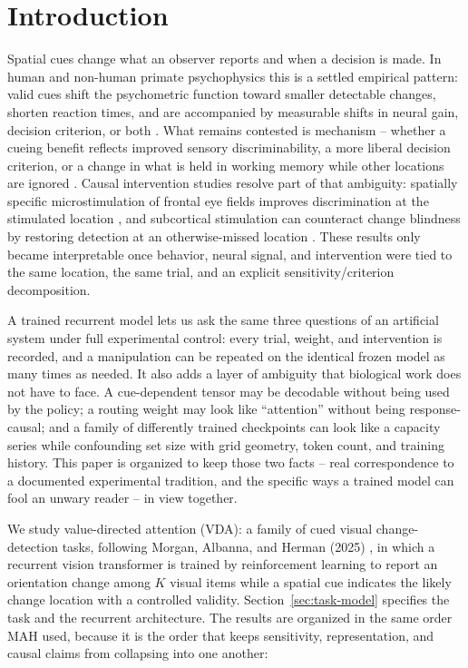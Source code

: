 \documentclass[11pt,a4paper]{article}
\begin{document}
\section{Introduction}
Spatial cues change what an observer reports and when a decision is made. In human and non-human primate psychophysics this is a settled empirical pattern: valid cues shift the psychometric function toward smaller detectable changes, shorten reaction times, and are accompanied by measurable shifts in neural gain, decision criterion, or both \citep{carrasco2011}. What remains contested is mechanism -- whether a cueing benefit reflects improved sensory discriminability, a more liberal decision criterion, or a change in what is held in working memory while other locations are ignored \citep{luo2018,luck1997,awh2001}. Causal intervention studies resolve part of that ambiguity: spatially specific microstimulation of frontal eye fields improves discrimination at the stimulated location \citep{moore2003}, and subcortical stimulation can counteract change blindness by restoring detection at an otherwise-missed location \citep{cavanaugh2004}. These results only became interpretable once behavior, neural signal, and intervention were tied to the same location, the same trial, and an explicit sensitivity/criterion decomposition.

A trained recurrent model lets us ask the same three questions of an artificial system under full experimental control: every trial, weight, and intervention is recorded, and a manipulation can be repeated on the identical frozen model as many times as needed. It also adds a layer of ambiguity that biological work does not have to face. A cue-dependent tensor may be decodable without being used by the policy; a routing weight may look like ``attention'' without being response-causal; and a family of differently trained checkpoints can look like a capacity series while confounding set size with grid geometry, token count, and training history. This paper is organized to keep those two facts -- real correspondence to a documented experimental tradition, and the specific ways a trained model can fool an unwary reader -- in view together.

We study value-directed attention (VDA): a family of cued visual change-detection tasks, following Morgan, Albanna, and Herman (2025) \citep{mah2025}, in which a recurrent vision transformer is trained by reinforcement learning to report an orientation change among $K$ visual items while a spatial cue indicates the likely change location with a controlled validity. Section~\ref{sec:task-model} specifies the task and the recurrent architecture. The results are organized in the same order MAH used, because it is the order that keeps sensitivity, representation, and causal claims from collapsing into one another:
\end{document}

